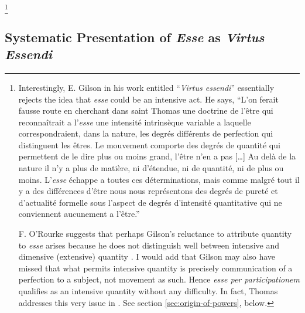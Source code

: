 \footnote{Interestingly, E. Gilson in his work entitled “\emph{Virtus essendi}” essentially rejects the idea that \emph{esse} could be an intensive act. He says, “L’on ferait fausse route en cherchant dans saint Thomas une doctrine de l’être qui reconnaîtrait a l’\emph{esse} une intensité intrinsèque variable a laquelle correspondraient, dans la nature, les degrés différents de perfection qui distinguent les êtres. Le mouvement comporte des degrés de quantité qui permettent de le dire plus ou moins grand, l’être n’en a pas [\ldots]
Au delà de la nature il n’y a plus de matière, ni d’étendue, ni de quantité, ni de plus ou moins. L’\emph{esse} échappe a toutes ces déterminations, mais comme malgré tout il y a des différences d’être nous nous représentons des degrés de pureté et d’actualité formelle sous l’aspect de degrés d’intensité quantitative qui ne conviennent aucunement a l’être.” 

F. O’Rourke suggests that perhaps Gilson’s reluctance to attribute quantity to \emph{esse} arises because he does not distinguish well between intensive and dimensive (extensive) quantity \parencite[45]{orourke:virtus}. I would add that Gilson may also have missed that what permits intensive quantity is precisely communication of a perfection to a subject, not movement as such. Hence \emph{esse per participationem} qualifies as an intensive quantity without any difficulty.
In fact, Thomas addresses this very issue in \cite[I, q.~77, a.~6, ad 3]{st:summa}. See section \ref{sec:origin-of-powers}, below.}
%

\subsection{Systematic Presentation of \emph{Esse} as \emph{Virtus Essendi}}

